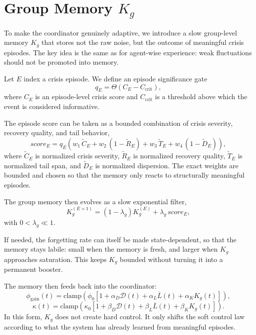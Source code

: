 \section{Group Memory $K_g$}
To make the coordinator genuinely adaptive, we introduce a slow group-level memory $K_g$ that stores not the raw noise, but the outcome of meaningful crisis episodes. The key idea is the same as for agent-wise experience: weak fluctuations should not be promoted into memory.

Let $E$ index a crisis episode. We define an episode significance gate
\begin{equation}
q_E = \Theta(C_E - C_{\mathrm{crit}}),
\end{equation}
where $C_E$ is an episode-level crisis score and $C_{\mathrm{crit}}$ is a threshold above which the event is considered informative.

The episode score can be taken as a bounded combination of crisis severity, recovery quality, and tail behavior,
\begin{equation}
score_E = q_E \left(
w_1\,\tilde C_E
+w_2\,(1-\tilde R_E)
+w_3\,\tilde T_E
+w_4\,(1-\tilde D_E)
\right),
\end{equation}
where $\tilde C_E$ is normalized crisis severity, $\tilde R_E$ is normalized recovery quality, $\tilde T_E$ is normalized tail span, and $\tilde D_E$ is normalized dispersion. The exact weights are bounded and chosen so that the memory only reacts to structurally meaningful episodes.

The group memory then evolves as a slow exponential filter,
\begin{equation}
K_g^{(E+1)} = (1-\lambda_g)K_g^{(E)} + \lambda_g\,score_E,
\end{equation}
with $0<\lambda_g\ll 1$.

If needed, the forgetting rate can itself be made state-dependent, so that the memory stays labile: small when the memory is fresh, and larger when $K_g$ approaches saturation. This keeps $K_g$ bounded without turning it into a permanent booster.

The memory then feeds back into the coordinator:
\begin{equation}
\phi_{\mathrm{gain}}(t)=\mathrm{clamp}\!\left(
\phi_0\left[1+\alpha_D\mathcal{D}(t)+\alpha_L\overline{L}(t)+\alpha_K K_g(t)\right]
\right),
\end{equation}
\begin{equation}
\kappa(t)=\mathrm{clamp}\!\left(
\kappa_0\left[1+\beta_D\mathcal{D}(t)+\beta_L\overline{L}(t)+\beta_K K_g(t)\right]
\right).
\end{equation}
In this form, $K_g$ does not create hard control. It only shifts the soft control law according to what the system has already learned from meaningful episodes.

